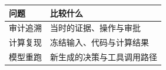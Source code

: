 \begin{tabular}{@{}P{4.0cm}P{8.5cm}@{}}
\toprule
\textbf{问题} & \textbf{比较什么} \\
\midrule
审计追溯 & 当时的证据、操作与审批 \\
计算复现 & 冻结输入、代码与计算结果 \\
模型重跑 & 新生成的决策与工具调用路径 \\
\bottomrule
\end{tabular}
